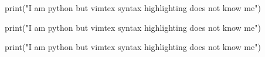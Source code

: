 \documentclass{article}
\begin{document}
\begin{python}
print("I am python but vimtex syntax highlighting does not know me")
\end{python}

\begin{pythonq}
print("I am python but vimtex syntax highlighting does not know me")
\end{pythonq}

\begin{pythonrepl}
print("I am python but vimtex syntax highlighting does not know me")
\end{pythonrepl}
\end{document}
